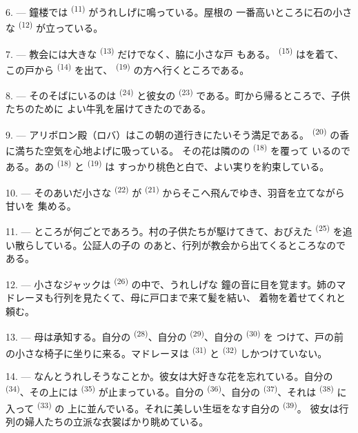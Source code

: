 6. --- 鐘楼では \textsuperscript{(11)} がうれしげに鳴っている。屋根の
一番高いところに石の小さな \textsuperscript{(12)} が立っている。

7. --- 教会には大きな \textsuperscript{(13)} だけでなく、脇に小さな戸
もある。 \textsuperscript{(15)} はを着て、この戸から
 \textsuperscript{(14)} を出て、 \textsuperscript{(19)}
の方へ行くところである。

8. --- そのそばにいるのは \textsuperscript{(24)} と彼女の
 \textsuperscript{(23)} である。町から帰るところで、子供たちのために
よい牛乳を届けてきたのである。

\VUsaut{4.0mm}
\VUsaut{3.4mm}

9. --- アリボロン殿（ロバ）はこの朝の道行きにたいそう満足である。
 \textsuperscript{(20)} の香に満ちた空気を心地よげに吸っている。
その花は隣のの \textsuperscript{(18)} を覆って
いるのである。あの
 \textsuperscript{(18)} と \textsuperscript{(19)} は
すっかり桃色と白で、よい実りを約束している。

10. --- そのあいだ小さな \textsuperscript{(22)} が
\textsuperscript{(21)} からそこへ飛んでゆき、羽音を立てながら甘いを
集める。

11. --- ところが何ごとであろう。村の子供たちが駆けてきて、おびえた
 \textsuperscript{(25)} を追い散らしている。公証人の子の
のあと、行列が教会から出てくるところなのである。

12. --- 小さなジャックは \textsuperscript{(26)} の中で、うれしげな
鐘の音に目を覚ます。姉のマドレーヌも行列を見たくて、母に戸口まで来て髪を結い、
着物を着せてくれと頼む。

13. --- 母は承知する。自分の \textsuperscript{(28)}、自分の
 \textsuperscript{(29)}、自分の \textsuperscript{(30)} を
つけて、戸の前の小さな椅子に坐りに来る。マドレーヌは
\textsuperscript{(31)} と \textsuperscript{(32)} しかつけていない。

14. --- なんとうれしそうなことか。彼女は大好きな花を忘れている。自分の
 \textsuperscript{(34)}、その上には
\textsuperscript{(35)} が止まっている。自分の
\textsuperscript{(36)}、自分の \textsuperscript{(37)}、それは
 \textsuperscript{(38)} に入って \textsuperscript{(33)} の
上に並んでいる。それに美しい生垣をなす自分の \textsuperscript{(39)}。
彼女は行列の婦人たちの立派な衣裳ばかり眺めている。

